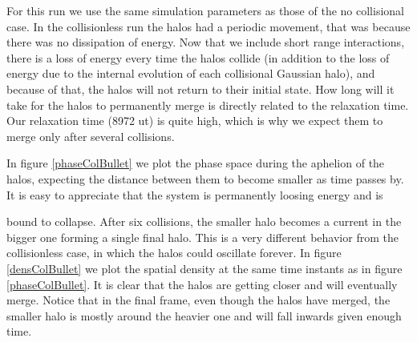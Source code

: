 For this run we use the same simulation parameters as those of the no collisional case.
In the collisionless run the halos had a periodic movement, that was because there was no dissipation of energy.
Now that we include short range interactions, there is a loss of energy every time the halos collide (in addition to the loss of energy due to the internal evolution of each collisional Gaussian halo), and because of that, the halos will not return to their initial state. How long will it take for the halos to permanently merge is directly related to the relaxation time. Our relaxation time (8972 ut) is quite high, which is why we expect them to merge only after several collisions.

In figure \ref{phaseColBullet} we plot the phase space during the aphelion of the halos, expecting the distance between them to become smaller as time passes by. It is easy to appreciate that the system is permanently loosing energy and is{ bound to collapse.
After six collisions, the smaller halo becomes a current in the bigger one forming a single final halo.
This is a very different behavior from the collisionless case, in which the halos could oscillate forever.
In figure \ref{densColBullet} we plot the spatial density at the same time instants as in figure \ref{phaseColBullet}. It is clear that the halos are getting closer and will eventually merge. Notice that in the final frame, even though the halos have merged, the smaller halo is mostly around the heavier one and will fall inwards given enough time.

}

